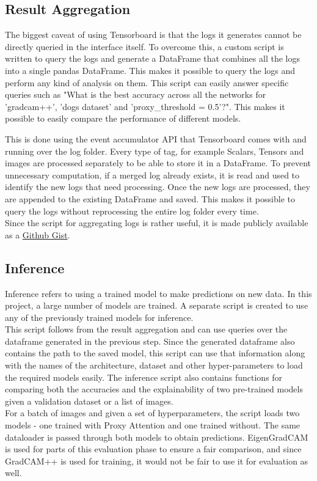 \documentclass[a4paper,11pt,openright]{book}
\begin{document}
\subsection{Result Aggregation} \label{sec:result_aggregation}
The biggest caveat of using Tensorboard is that the logs it generates cannot be directly queried in the interface itself. To overcome this, a custom script is written to query the logs and generate a DataFrame that combines all the logs into a single pandas DataFrame. This makes it possible to query the logs and perform any kind of analysis on them. This script can easily answer specific queries such as "What is the best accuracy across all the networks for 'gradcam++', 'dogs dataset' and 'proxy\_threshold = 0.5'?". This makes it possible to easily compare the performance of different models.

This is done using the event accumulator API that Tensorboard comes with and running over the log folder. Every type of tag, for example Scalars, Tensors and images are processed separately to be able to store it in a DataFrame. To prevent unnecessary computation, if a merged log already exists, it is read and used to identify the new logs that need processing. Once the new logs are processed, they are appended to the existing DataFrame and saved. This makes it possible to query the logs without reprocessing the entire log folder every time.\\
Since the script for aggregating logs is rather useful, it is made publicly available as a \href{https://gist.github.com/SubhadityaMukherjee/58cbdf324812175233e91993b720e0bc}{Github Gist}.

\subsection{Inference}
Inference refers to using a trained model to make predictions on new data. In this project, a large number of models are trained. A separate script is created to use any of the previously trained models for inference.\\
This script follows from the result aggregation and can use queries over the dataframe generated in the previous step. Since the generated dataframe also contains the path to the saved model, this script can use that information along with the names of the architecture, dataset and other hyper-parameters to load the required models easily.
The inference script also contains functions for comparing both the accuracies and the explainability of two pre-trained models given a validation dataset or a list of images.\\
For a batch of images and given a set of hyperparameters, the script loads two models - one trained with Proxy Attention and one trained without. The same dataloader is passed through both models to obtain predictions. EigenGradCAM \cite{banymuhammadEigenCAMVisualExplanations2021} is used for parts of this evaluation phase to ensure a fair comparison, and since GradCAM++ \cite{chattopadhayGradCAMGeneralizedGradientBased2018} is used for training, it would not be fair to use it for evaluation as well. 
\end{document}
